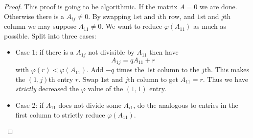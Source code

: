 \documentclass[a4paper]{article}
\theoremstyle{definition}
\begin{document}
\begin{proof}
  This proof is going to be algorithmic. If the matrix \(A = 0\) we are done. Otherwise there is a \(A_{ij} \neq 0\). By swapping \(1\)st and \(i\)th row, and \(1\)st and \(j\)th column we may suppose \(A_{11} \neq 0\). We want to reduce \(\varphi(A_{11})\) as much as possible. Split into three cases:
  \begin{itemize}
  \item Case 1: if there is a \(A_{1j}\) not divisible by \(A_{11}\) then have
    \[
      A_{1j} = q A_{11} + r
    \]
    with \(\varphi(r) < \varphi(A_{11})\). Add \(-q\) times the \(1\)st column to the \(j\)th. This makes the \((1,j)\)th entry \(r\). Swap \(1\)st and \(j\)th column to get \(A_{11} = r\). Thus we have \emph{strictly} decreased the \(\varphi\) value of the \((1, 1)\) entry.
  \item Case 2: if \(A_{11}\) does not divide some \(A_{i1}\), do the analogous to entries in the first column to strictly reduce \(\varphi(A_{11})\).


\end{itemize}
\end{proof}
\end{document}
